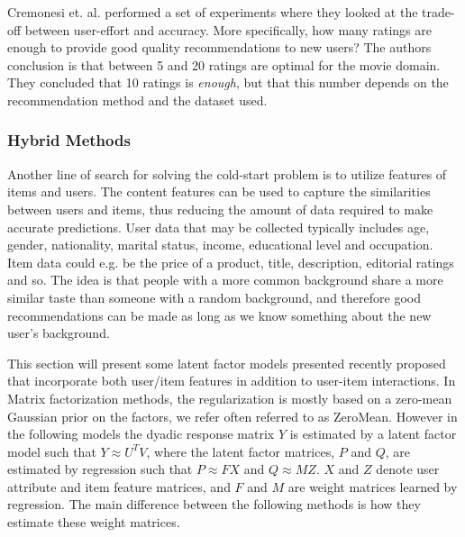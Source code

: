 Cremonesi et. al. \cite{Cremonesi2012} performed a set of experiments where
they looked at the trade-off between user-effort and accuracy. More
specifically, how many ratings are enough to provide good quality
recommendations to new users? The authors conclusion is that between 5 and 20
ratings are optimal for the movie domain. They concluded that 10
ratings is \emph{enough}, but that this number depends on the recommendation method
and the dataset used.

\subsubsection{Hybrid Methods}


Another line of search for solving the cold-start problem is to utilize features of items and users. The content features can be used to capture the similarities between users and items, thus reducing the amount of data required to make accurate predictions. User data that may be collected typically includes age, gender, nationality, marital status, income, educational level and occupation. Item data could e.g. be the price of a product, title, description, editorial ratings and so. The idea is that people with a more common background share a more similar taste than someone with a random background, and therefore good recommendations can be made as long as we know something about the new user’s background. 

This section will present some latent factor models presented recently proposed that incorporate both user/item features in addition to user-item interactions. In Matrix factorization methods, the regularization is mostly based on a
zero-mean Gaussian prior on the factors, we refer often referred to as ZeroMean. However in the following models the dyadic response matrix $Y$ is estimated by a latent factor model such that $Y \approx U^{T}V$, where the latent factor matrices, $P$ and $Q$, are estimated by regression such that $P \approx FX$ and $Q \approx MZ$. $X$ and $Z$ denote user attribute and item feature matrices, and $F$ and $M$ are weight matrices learned by regression. The main difference between the following methods is how they estimate these weight matrices.


